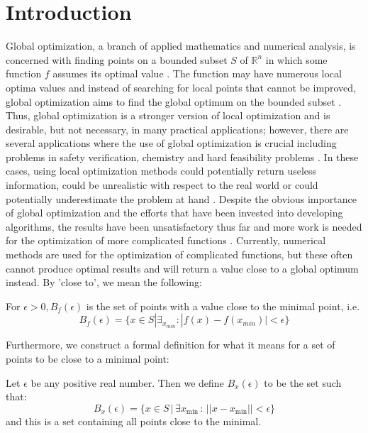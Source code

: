 \section{Introduction}
\label{sec:intro}

Global optimization, a branch of applied mathematics and numerical analysis, is concerned with finding points on a bounded subset $S$ of $\mathbb{R}^n$ in which some function $f$ assumes its optimal value \cite{dekkers}. The function may have numerous local optima values and instead of searching for local points that cannot be improved, global optimization aims to find the global optimum on the bounded subset \cite{neumaier}. Thus, global optimization is a stronger version of local optimization and is desirable, but not necessary, in many practical applications; however, there are several applications where the use of global optimization is crucial including problems in safety verification, chemistry and hard feasibility problems \cite{neumaier}. In these cases, using local optimization methods could potentially return useless information, could be unrealistic with respect to the real world or could potentially underestimate the problem at hand \cite{neumaier}. Despite the obvious importance of global optimization and the efforts that have been invested into developing algorithms, the results have been unsatisfactory thus far and more work is needed for the optimization of more complicated functions \cite{dekkers}. Currently, numerical methods are used for the optimization of complicated functions, but these often cannot produce optimal results and will return a value close to a global optimum instead. By 'close to', we mean the following:

\begin{definition}
For $\epsilon > 0, B_f(\epsilon) $ is the set of points with a value close to the minimal point, i.e.
\begin{equation}
    B_f(\epsilon)=\{x \in S |\exists_{{x}_{min}}:|f(x)-f({x}_{min})|<\epsilon \}
\end{equation}
\end{definition}

Furthermore, we construct a formal definition for what it means for a set of points to be close to a minimal point:
\begin{definition}
Let $\epsilon$ be any positive real number. Then we define $B_x(\epsilon)$ to be the set such that:
\begin{equation}
    B_x(\epsilon) = \{ x \in S \, | \, \exists x_{\min} \, : \, ||x-x_{\min}|| < \epsilon \}
\end{equation}
and this is a set containing all points close to the minimal.
\label{def:close-to-min}
\end{definition}

